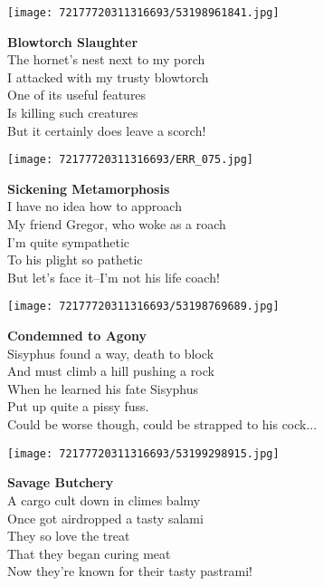 \documentclass[10pt,letterpaper]{article}
\begin{document}
\begin{center}\texttt{[image: 72177720311316693/53198961841.jpg]}
\end{center}
\begin{center}
\textbf{Blowtorch Slaughter}\\
\vskip 0.2in
The hornet's nest next to my porch\\
I attacked with my trusty blowtorch\\
One of its useful features\\
Is killing such creatures\\
But it certainly does leave a scorch!\\
\end{center}
\pagebreak

\begin{center}\texttt{[image: 72177720311316693/ERR\_075.jpg]}
\end{center}
\begin{center}
\textbf{Sickening Metamorphosis}\\
\vskip 0.2in
I have no idea how to approach\\
My friend Gregor, who woke as a roach\\
I'm quite sympathetic\\
To his plight so pathetic\\
But let's face it--I'm not his life coach!\\
\end{center}
\pagebreak

\begin{center}
\texttt{[image: 72177720311316693/53198769689.jpg]}
\end{center}

\begin{center}
\textbf{Condemned to Agony}\\
\vskip 0.2in
Sisyphus found a way, death to block\\
And must climb a hill pushing a rock\\
When he learned his fate Sisyphus\\
Put up quite a pissy fuss.\\
Could be worse though, could be strapped to his cock...\\
\end{center}
\pagebreak

\begin{center}\texttt{[image: 72177720311316693/53199298915.jpg]}
\end{center}
\begin{center}
\textbf{Savage Butchery}\\
\vskip 0.2in
A cargo cult down in climes balmy\\
Once got airdropped a tasty salami\\
They so love the treat\\
That they began curing meat\\
Now they're known for their tasty pastrami!\\
\end{center}
\pagebreak
\end{document}
